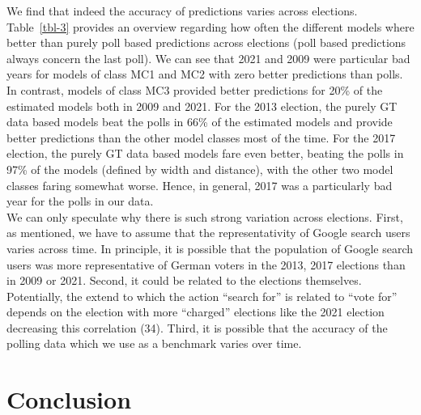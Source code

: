 \documentclass[
  letterpaper,
  DIV=11,
  numbers=noendperiod]{scrartcl}
\begin{document}
We find that indeed the accuracy of predictions varies across elections.
Table~\ref{tbl-3} provides an overview regarding how often the different
models where better than purely poll based predictions across elections
(poll based predictions always concern the last poll). We can see that
2021 and 2009 were particular bad years for models of class MC1 and MC2
with zero better predictions than polls. In contrast, models of class
MC3 provided better predictions for 20\% of the estimated models both in
2009 and 2021. For the 2013 election, the purely GT data based models
beat the polls in 66\% of the estimated models and provide better
predictions than the other model classes most of the time. For the 2017
election, the purely GT data based models fare even better, beating the
polls in 97\% of the models (defined by width and distance), with the
other two model classes faring somewhat worse. Hence, in general, 2017
was a particularly bad year for the polls in our data.\\
We can only speculate why there is such strong variation across
elections. First, as mentioned, we have to assume that the
representativity of Google search users varies across time. In
principle, it is possible that the population of Google search users was
more representative of German voters in the 2013, 2017 elections than in
2009 or 2021. Second, it could be related to the elections themselves.
Potentially, the extend to which the action ``search for'' is related to
``vote for'' depends on the election with more ``charged'' elections
like the 2021 election decreasing this correlation (34). Third, it is
possible that the accuracy of the polling data which we use as a
benchmark varies over time.

\hypertarget{sec-conclusion}{%
\section{Conclusion}\label{sec-conclusion}}
\end{document}
